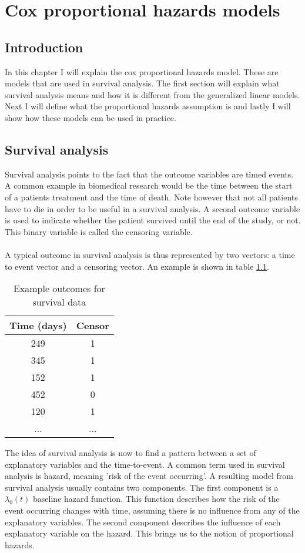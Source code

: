 \chapter{Cox proportional hazards models}
\label{cha:cox}

\section{Introduction}
\label{sec:cox-introduction}
In this chapter I will explain the cox proportional hazards model. These are models that are used in survival analysis. The first section will explain what survival analysis means and how it is different from the generalized linear models. Next I will define what the proportional hazards assumption is and lastly I will show how these models can be used in practice.

\section{Survival analysis}
\label{sec:cox-survival-analysis}
Survival analysis points to the fact that the outcome variables are timed events. A common example in biomedical research would be the time between the start of a patients treatment and the time of death. Note however that not all patients have to die in order to be useful in a survival analysis. A second outcome variable is used to indicate whether the patient survived until the end of the study, or not. This binary variable is called the censoring variable. \\ \\
A typical outcome in survival analysis is thus represented by two vectors: a time to event vector and a censoring vector. An example is shown in table \ref{tab:cox-example-outcome}.
\begin{table}
	\centering
	\begin{tabular}{cc}
		\toprule
		Time (days) & Censor\\
		\midrule
		249 & 1 \\
		345 & 1 \\
		152 & 1 \\
		452 & 0 \\
		120 & 1 \\
		... & ... \\
		\bottomrule
	\end{tabular}
	\caption{Example outcomes for survival data}
	\label{tab:cox-example-outcome}
\end{table}
The idea of survival analysis is now to find a pattern between a set of explanatory variables and the time-to-event. A common term used in survival analysis is hazard, meaning 'risk of the event occurring'. A resulting model from survival analysis usually contains two components. The first component is a $\lambda_{0}(t)$ baseline hazard function. This function describes how the risk of the event occurring changes with time, assuming there is no influence from any of the explanatory variables. The second component describes the influence of each explanatory variable on the hazard. This brings us to the notion of proportional hazards.

